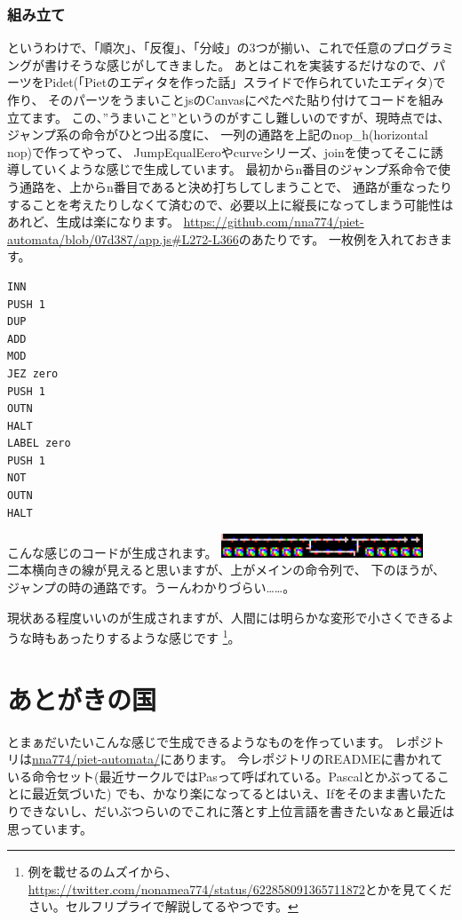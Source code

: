 \documentclass[twocolumn,8pt,b5paper]{extarticle}
\begin{document}
\subsubsection{組み立て}
というわけで、「順次」、「反復」、「分岐」の3つが揃い、これで任意のプログラミングが書けそうな感じがしてきました。
あとはこれを実装するだけなので、パーツをPidet(「Pietのエディタを作った話」スライドで作られていたエディタ)で作り、
そのパーツをうまいことjsのCanvasにぺたぺた貼り付けてコードを組み立てます。
この、”うまいこと”というのがすこし難しいのですが、現時点では、ジャンプ系の命令がひとつ出る度に、
一列の通路を上記のnop\_h(horizontal nop)で作ってやって、
JumpEqualEeroやcurveシリーズ、joinを使ってそこに誘導していくような感じで生成しています。
最初からn番目のジャンプ系命令で使う通路を、上からn番目であると決め打ちしてしまうことで、
通路が重なったりすることを考えたりしなくて済むので、必要以上に縦長になってしまう可能性はあれど、生成は楽になります。
\url{https://github.com/nna774/piet-automata/blob/07d387/app.js#L272-L366}のあたりです。
一枚例を入れておきます。
\begin{lstlisting}[frame=single]
INN
PUSH 1
DUP
ADD
MOD
JEZ zero
PUSH 1
OUTN
HALT
LABEL zero
PUSH 1
NOT
OUTN
HALT
\end{lstlisting}
こんな感じのコードが生成されます。
\includegraphics[width=6cm,clip]{images/even-or-odd.png}\\
二本横向きの線が見えると思いますが、上がメインの命令列で、
下のほうが、ジャンプの時の通路です。うーんわかりづらい……。

現状ある程度いいのが生成されますが、人間には明らかな変形で小さくできるような時もあったりするような感じです 
\footnote{例を載せるのムズイから、\url{https://twitter.com/nonamea774/status/622858091365711872}とかを見てください。セルフリプライで解説してるやつです。}。

\section{あとがきの国}
とまぁだいたいこんな感じで生成できるようなものを作っています。
レポジトリは\href{https://github.com/nna774/piet-automata/}{nna774/piet-automata/}にあります。
今レポジトリのREADMEに書かれている命令セット(最近サークルではPasって呼ばれている。Pascalとかぶってることに最近気づいた)
でも、かなり楽になってるとはいえ、Ifをそのまま書いたたりできないし、だいぶつらいのでこれに落とす上位言語を書きたいなぁと最近は思っています。
\end{document}
